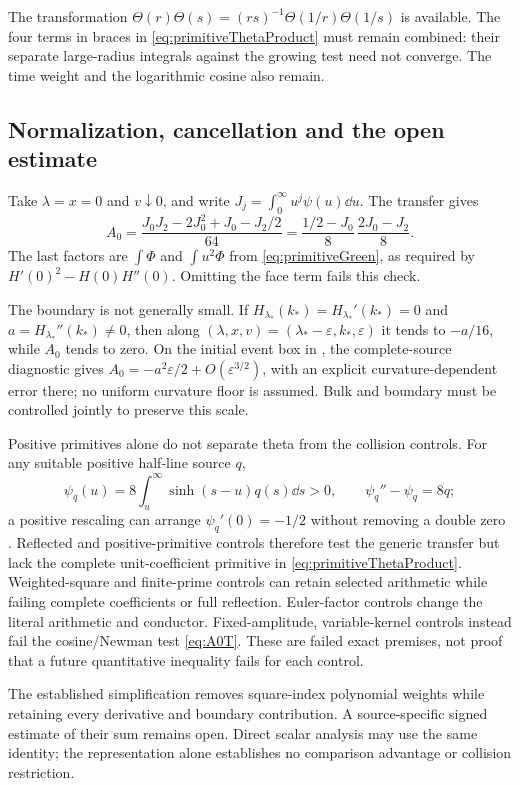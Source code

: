 The transformation
$\Theta(r)\Theta(s)=(rs)^{-1}\Theta(1/r)\Theta(1/s)$ is available.
The four terms in braces in \eqref{eq:primitiveThetaProduct} must remain
combined: their separate large-radius integrals against the growing test
need not converge. The time weight and the logarithmic cosine also remain.

\subsection{Normalization, cancellation and the open estimate}
Take $\lambda=x=0$ and $v\downarrow0$, and write
$J_j=\int_0^\infty u^j\psi(u)\dd u$. The transfer gives
\begin{equation}\label{eq:primitiveNormalization}
 A_0=\frac{J_0J_2-2J_0^2+J_0-J_2/2}{64}
 =\frac{1/2-J_0}{8}\,\frac{2J_0-J_2}{8}.
\end{equation}
The last factors are $\int\Phi$ and $\int u^2\Phi$ from
\eqref{eq:primitiveGreen}, as required by $H'(0)^2-H(0)H''(0)$.
Omitting the face term fails this check.

The boundary is not generally small. If
$H_{\lambda_*}(k_*)=H_{\lambda_*}'(k_*)=0$ and
$a=H_{\lambda_*}''(k_*)\ne0$, then along
$(\lambda,x,v)=(\lambda_*-\varepsilon,k_*,\varepsilon)$ it tends to
$-a/16$, while $A_0$ tends to zero. On the initial event box in
\cite{TNDB03Gaussian}, the complete-source diagnostic gives
$A_0=-a^2\varepsilon/2+O(\varepsilon^{3/2})$, with an explicit
curvature-dependent error there; no uniform curvature floor is assumed.
Bulk and boundary must be controlled jointly to preserve this scale.

Positive primitives alone do not separate theta from the collision
controls. For any suitable positive half-line source $q$,
\[
 \psi_q(u)=8\int_u^\infty\sinh(s-u)q(s)\dd s>0,
 \qquad \psi_q''-\psi_q=8q;
\]
a positive rescaling can arrange $\psi_q'(0)=-1/2$ without removing a
double zero \cite{RadialThetaIBP}. Reflected and positive-primitive
controls therefore test the generic transfer but lack the complete
unit-coefficient primitive in \eqref{eq:primitiveThetaProduct}.
Weighted-square and finite-prime controls can retain selected arithmetic
while failing complete coefficients or full reflection. Euler-factor
controls change the literal arithmetic and conductor. Fixed-amplitude,
variable-kernel controls instead fail the cosine/Newman test
\eqref{eq:A0T}. These are failed exact premises, not proof that a future
quantitative inequality fails for each control.

The established simplification removes square-index polynomial weights
while retaining every derivative and boundary contribution. A
source-specific signed estimate of their sum remains open. Direct scalar
analysis may use the same identity; the representation alone establishes
no comparison advantage or collision restriction.
